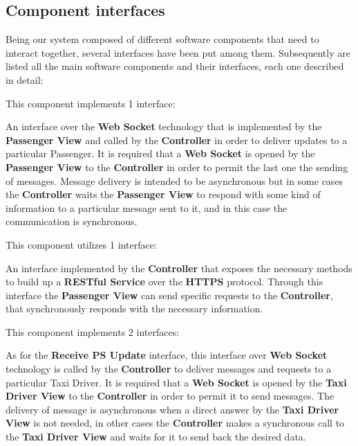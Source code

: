 \subsection{Component interfaces}
Being our system composed of different software components that need to interact together, several interfaces have been put among them.
Subsequently are listed all the main software components and their interfaces, each one described in detail:
\begin{itemize}
	This component implements 1 interface:
	\begin{itemize}
		 An interface over the \textbf{Web Socket} technology that is implemented by the \textbf{Passenger View} and called by the \textbf{Controller} in order to deliver updates to a particular Passenger.
		It is required that a \textbf{Web Socket} is opened by the \textbf{Passenger View} to the \textbf{Controller} in order to permit the last one the sending of messages.
		Message delivery is intended to be asynchronous but in some cases the \textbf{Controller} waits the \textbf{Passenger View} to respond with some kind of information to a particular message sent to it, and in this case the communication is synchronous.
	\end{itemize}
	This component utilizes 1 interface:
	\begin{itemize}
		 An interface implemented by the \textbf{Controller} that exposes the necessary methods to build up a \textbf{RESTful Service} over the \textbf{HTTPS} protocol.
		Through this interface the \textbf{Passenger View} can send specific requests to the \textbf{Controller}, that synchronously responds with the necessary information.
	\end{itemize}
	\itemBold{Taxi Driver View}
	This component implements 2 interfaces:
	\begin{itemize}
		 As for the \textbf{Receive PS Update} interface, this interface over \textbf{Web Socket} technology is called by the \textbf{Controller} to deliver messages and requests to a particular Taxi Driver.
		It is required that a \textbf{Web Socket} is opened by the \textbf{Taxi Driver View} to the \textbf{Controller} in order to permit it to send messages.
		The delivery of message is asynchronous when a direct answer by the \textbf{Taxi Driver View} is not needed, in other cases the \textbf{Controller} makes a synchronous call to the \textbf{Taxi Driver View} and waits for it to send back the desired data.

\end{itemize}
\end{itemize}
